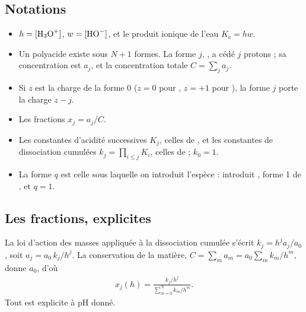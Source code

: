 \documentclass[a4paper,11pt]{article}
\newcommand\pH{\ensuremath{\mathrm{pH}}\xspace}
\newcommand\Ke{\ensuremath{K_\mathrm{e}}\xspace}
\newcommand\co[1]{[\ce{#1}]}
\begin{document}
\subsection{Notations}
\begin{itemize}
\item $h=\co{H3O+}$, $w=\co{HO-}$, et le produit ionique de l'eau $\Ke=hw$.
\item Un polyacide  existe sous $N+1$ formes.
La forme $j$, , a cédé $j$ protons ; sa concentration est $a_j$, et la concentration totale $C=\sum_ja_j$.
\item Si $z$ est la charge de la forme 0 ($z=0$ pour , $z=+1$ pour ), la forme $j$ porte la charge $z-j$.
\item Les fractions $x_j=a_j/C$.
\item Les constantes d'acidité successives $K_j$, celles de , et les constantes de dissociation cumulées $k_j=\prod_{i\le j}K_i$, celles de  ; $k_0=1$.
\item La forme $q$ est celle sous laquelle on introduit l'espèce :  introduit , forme 1 de , et $q=1$.
\end{itemize}

\subsection{Les fractions, explicites}
La loi d'action des masses appliquée à la dissociation cumulée s'écrit $k_j=h^ja_j/a_0$, soit $a_j=a_0\,k_j/h^j$.
La conservation de la matière, $C=\sum_ma_m=a_0\sum_mk_m/h^m$, donne $a_0$, d'où
\begin{align}
x_j(h)=\frac{k_j/h^j}{\sum_{m=0}^Nk_m/h^m}.
\label{eq:fractions}
\end{align}
Tout est explicite à \pH donné.
\end{document}

